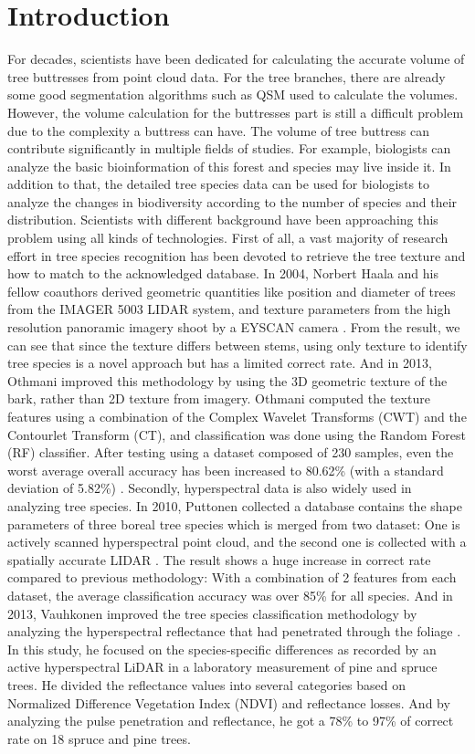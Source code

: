 \documentclass[runningheads,a4paper]{llncs}
\begin{document}
\section{Introduction}
For decades, scientists have been dedicated for calculating the accurate volume of tree buttresses from point cloud data. For the tree branches, there are already some good segmentation algorithms such as QSM used to calculate the volumes. However, the volume calculation for the buttresses part is still a difficult problem due to the complexity a buttress can have. The volume of tree buttress can contribute significantly in multiple fields of studies. For example, biologists can analyze the basic bioinformation of this forest and species may live inside it. In addition to that, the detailed tree species data can be used for biologists to analyze the changes in biodiversity according to the number of species and their distribution. Scientists with different background have been approaching this problem using all kinds of technologies.
First of all, a vast majority of research effort in tree species recognition has been devoted to retrieve the tree texture and how to match to the acknowledged database. In 2004, Norbert Haala and his fellow coauthors derived geometric quantities like position and diameter of trees from the IMAGER 5003 LIDAR system, and texture parameters from the high resolution panoramic imagery shoot by a EYSCAN camera \cite{1}. From the result, we can see that since the texture differs between stems, using only texture to identify tree species is a novel approach but has a limited correct rate. And in 2013, Othmani improved this methodology by using the 3D geometric texture of the bark, rather than 2D texture from imagery. Othmani computed the texture features using a combination of the Complex Wavelet Transforms (CWT) and the Contourlet Transform (CT), and classification was done using the Random Forest (RF) classifier. 
After testing using a dataset composed of 230 samples, even the worst average overall accuracy has been increased to 80.62\% (with a standard deviation of 5.82\%) \cite{2}.
Secondly, hyperspectral data is also widely used in analyzing tree species. In 2010, Puttonen collected a database contains the shape parameters of three boreal tree species which is merged from two dataset: One is actively scanned hyperspectral point cloud, and the second one is collected with a spatially accurate LIDAR \cite{3}. The result shows a huge increase in correct rate compared to previous methodology: With a combination of 2 features from each dataset, the average classification accuracy was over 85\% for all species. And in 2013, Vauhkonen improved the tree species classification methodology by analyzing the hyperspectral reflectance that had penetrated through the foliage \cite{4}. In this study, he focused on the species-specific differences as recorded by an active hyperspectral LiDAR in a laboratory measurement of pine and spruce trees. He divided the reflectance values into several categories based on Normalized Difference Vegetation Index (NDVI) and reflectance losses. And by analyzing the pulse penetration and reflectance, he got a 78\% to 97\% of correct rate on 18 spruce and pine trees.
\end{document}
